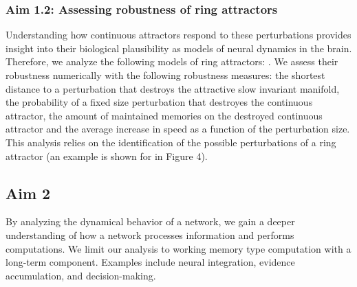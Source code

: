 \documentclass[12pt,letterpaper, onecolumn]{article}
\theoremstyle{definition}
\theoremstyle{remark}
\begin{document}



\subsubsection*{Aim 1.2: Assessing robustness of ring attractors}
Understanding how continuous attractors respond to these perturbations provides insight into their biological plausibility as models of neural dynamics in the brain.
Therefore, we analyze the following models of ring attractors: \citep{pollock2020, barak2021mapping, beiran2021, noorman2022}.
We assess their robustness numerically with the following robustness measures:
the shortest distance to a perturbation that destroys the attractive slow invariant manifold,
the probability of a fixed size perturbation that destroyes the continuous attractor,
the amount of maintained memories on the destroyed continuous attractor and
the average increase in speed as a function of the perturbation size.
This analysis relies on the identification of the possible perturbations of a ring attractor (an example is shown for \citep{noorman2022} in Figure 4).










\newpage

\subsection*{Aim 2}
By analyzing the dynamical behavior of a network, we gain a deeper understanding of how a network processes information and performs computations.
 We limit our analysis to working memory type computation with a long-term component. Examples include  neural integration, evidence accumulation, and decision-making.
\end{document}
